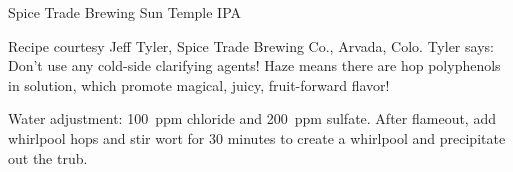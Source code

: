 \begin{recipie}{Spice Trade Brewing Sun Temple IPA}

\begin{aboutblock}
Recipe courtesy Jeff Tyler, Spice Trade Brewing Co., Arvada, Colo. Tyler says:
Don't use any cold-side clarifying agents! Haze means there are hop polyphenols
in solution, which promote magical, juicy, fruit-forward flavor!
\end{aboutblock}


\begin{methodandtiming}
 
\begin{mashsteps}
\end{mashsteps}

\begin{fermentationsteps}
\end{fermentationsteps}

\begin{directions}
Water adjustment: 100~ppm chloride and 200~ppm sulfate. After flameout,
add whirlpool hops and stir wort for 30 minutes to create a whirlpool and
precipitate out the trub.
\end{directions}

\end{methodandtiming}

\pagebreak

\begin{ingredientsblock}

\begin{malts}
\end{malts}

\begin{hops}
\end{hops}


\end{ingredientsblock}
\end{recipie}
